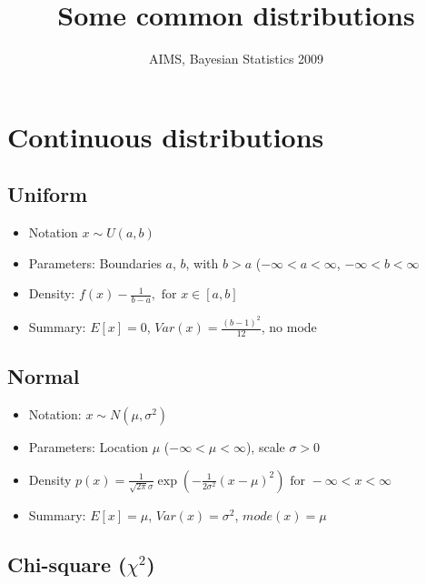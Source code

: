 \documentclass{article}
\author{AIMS, Bayesian Statistics 2009}
\title{Some common distributions}
\begin{document}
\maketitle

\section{Continuous distributions}


\subsection{Uniform}


\begin{itemize}
\item[] Notation $x \sim U(a,b)$

\item[] Parameters: Boundaries $a$, $b$, with $b > a$ ($-\infty < a < \infty$, $-\infty < b < \infty$

\item[] Density: $f(x) - \frac{1}{b-a}, \mbox{ for } x \in [a,b]$

\item[] Summary: $E[x]=0$, $Var(x)=\frac{(b-1)^2}{12}$, no mode
\end{itemize}


\subsection{Normal}

\begin{itemize}
\item[] Notation: $x \sim N(\mu, \sigma^2)$

\item[] Parameters: Location $\mu$ ($-\infty < \mu < \infty$), scale $\sigma > 0$

\item[] Density $p(x) = \frac{1}{\sqrt{2 \pi} \sigma} \exp \left( -\frac{1}{2 \sigma^2}(x-\mu)^2 \right) \mbox{ for } -\infty < x < \infty$

\item[] Summary: $E[x]=\mu$, $Var(x)=\sigma^2$, $mode(x)=\mu$
\end{itemize}





\subsection{Chi-square ($\chi^2$)}
\end{document}
